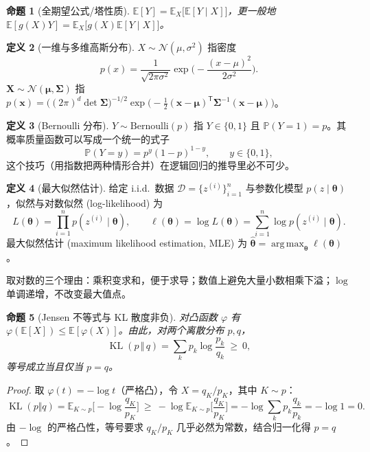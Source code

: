 \documentclass[UTF8,a4paper,11pt]{ctexart}
\theoremstyle{definition}
\newtheorem{definition}{定义}[section]
\theoremstyle{plain}
\newtheorem{proposition}[definition]{命题}
\theoremstyle{remark}
\DeclareMathOperator*{\argmax}{arg\,max}
\DeclareMathOperator{\KL}{KL}
\newcommand{\E}{\mathbb{E}}
\newcommand{\Prob}{\mathbb{P}}
\newcommand{\D}{\mathcal{D}}
\newcommand{\T}{^{\mathsf{T}}}
\newcommand{\eng}[1]{\textup{(#1)}}
\begin{document}
\begin{proposition}[全期望公式/塔性质]\label{prop:tower}
$\E[Y]=\E_{X}\big[\E[Y\mid X]\big]$，更一般地 $\E[g(X)Y]=\E_X\big[g(X)\E[Y\mid X]\big]$。
\end{proposition}

\begin{definition}[一维与多维高斯分布]
$X\sim\mathcal{N}(\mu,\sigma^2)$ 指密度
\[
  p(x)=\frac{1}{\sqrt{2\pi\sigma^2}}\exp\Big(-\frac{(x-\mu)^2}{2\sigma^2}\Big).
\]
$\bm{X}\sim\mathcal{N}(\bm{\mu},\bm{\Sigma})$ 指
$p(\bm{x})=\big((2\pi)^d\det\bm{\Sigma}\big)^{-1/2}\exp\big(-\tfrac12(\bm{x}-\bm{\mu})\T\bm{\Sigma}^{-1}(\bm{x}-\bm{\mu})\big)$。
\end{definition}

\begin{definition}[Bernoulli 分布]
$Y\sim\mathrm{Bernoulli}(p)$ 指 $Y\in\{0,1\}$ 且 $\Prob(Y=1)=p$。其概率质量函数可以写成一个统一的式子
\begin{equation}\label{eq:bern}
  \Prob(Y=y)=p^{y}(1-p)^{1-y},\qquad y\in\{0,1\},
\end{equation}
这个技巧（用指数把两种情形合并）在逻辑回归的推导里必不可少。
\end{definition}

\begin{definition}[最大似然估计]\label{def:mle}
给定 i.i.d.\ 数据 $\D=\{z^{(i)}\}_{i=1}^n$ 与参数化模型 $p(z\mid\bm{\theta})$，似然与对数似然 \eng{log-likelihood} 为
\[
  L(\bm{\theta})=\prod_{i=1}^{n}p(z^{(i)}\mid\bm{\theta}),\qquad
  \ell(\bm{\theta})=\log L(\bm{\theta})=\sum_{i=1}^{n}\log p(z^{(i)}\mid\bm{\theta}).
\]
最大似然估计 \eng{maximum likelihood estimation, MLE} 为 $\hat{\bm{\theta}}=\argmax_{\bm{\theta}}\ell(\bm{\theta})$。
\end{definition}

取对数的三个理由：乘积变求和，便于求导；数值上避免大量小数相乘下溢；$\log$ 单调递增，不改变最大值点。

\begin{proposition}[Jensen 不等式与 KL 散度非负]\label{prop:kl}
对凸函数 $\varphi$ 有 $\varphi(\E[X])\le\E[\varphi(X)]$。由此，对两个离散分布 $p,q$，
\[
  \KL(p\,\Vert\,q)=\sum_k p_k\log\frac{p_k}{q_k}\ \ge\ 0,
\]
等号成立当且仅当 $p=q$。
\end{proposition}

\begin{proof}
取 $\varphi(t)=-\log t$（严格凸），令 $X=q_K/p_K$，其中 $K\sim p$：
\[
  \KL(p\Vert q)=\E_{K\sim p}\Big[-\log\frac{q_K}{p_K}\Big]
  \ \ge\ -\log\E_{K\sim p}\Big[\frac{q_K}{p_K}\Big]
  =-\log\sum_k p_k\frac{q_k}{p_k}=-\log 1=0 .
\]
由 $-\log$ 的严格凸性，等号要求 $q_K/p_K$ 几乎必然为常数，结合归一化得 $p=q$。
\end{proof}
\end{document}
